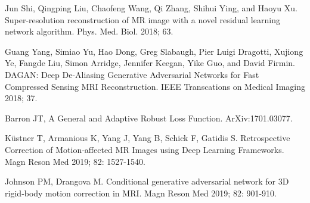 \documentclass[runningheads]{llncs}
\begin{document}
\begin{thebibliography}{8}
Jun Shi, Qingping Liu, Chaofeng Wang, Qi Zhang, Shihui Ying, and Haoyu Xu. Super-resolution reconstruction of MR image with a novel residual learning network algorithm. Phys. Med. Biol. 2018; 63. 

Guang Yang, Simiao Yu, Hao Dong, Greg Slabaugh, Pier Luigi Dragotti, Xujiong Ye, Fangde Liu, Simon Arridge, Jennifer Keegan, Yike Guo, and David Firmin. DAGAN: Deep De-Aliasing Generative Adversarial Networks for Fast Compressed Sensing MRI Reconstruction. IEEE Transcations on Medical Imaging 2018; 37. 

Barron JT, A General and Adaptive Robust Loss Function. ArXiv:1701.03077.

Küstner T, Armanious K, Yang J, Yang B, Schick F, Gatidis S. Retrospective Correction of Motion‐affected MR Images using Deep Learning Frameworks. Magn Reson Med 2019; 82: 1527-1540.

Johnson PM, Drangova M. Conditional generative adversarial network for 3D rigid‐body
motion correction in MRI. Magn Reson Med 2019; 82: 901-910.



\end{thebibliography}
\end{document}
